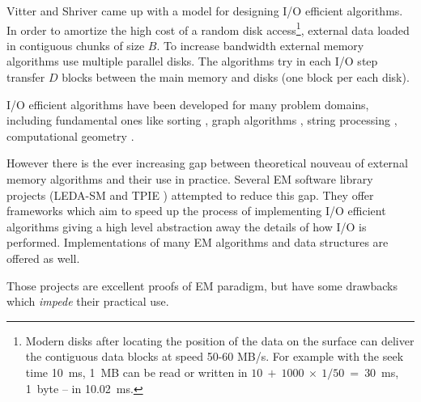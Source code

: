 \documentclass[twoside]{book}
\begin{document}
Vitter and Shriver \cite{VitShr94both} came up with a model for designing I/O
efficient algorithms. In order to amortize the high cost of a random
disk access\footnote{Modern disks after locating the position of the
data on the surface can deliver the contiguous data blocks at speed
50-60 MB/s. For example with the seek time 10~ms, 1~MB can be read or
written in $10~+~1000~\times~1/50~=~30$~ms, 1~byte -- in 10.02~ms.},
external data loaded in contiguous chunks of size $B$. To increase
bandwidth external memory algorithms use multiple parallel disks. The
algorithms try in each I/O step transfer $D$ blocks between the main
memory and disks (one block per each disk).


I/O efficient algorithms have been developed for many
problem domains, including fundamental ones like sorting \cite{},
graph algorithms \cite{}, string processing \cite{}, computational
geometry \cite{}. 

However there is the ever increasing gap between theoretical
nouveau of external memory algorithms and their use in practice.   
Several EM software library projects (LEDA-SM \cite{CraMeh99} and TPIE
\cite{APV02}) attempted to 
reduce this gap. They offer frameworks which aim to speed up the
process of implementing I/O efficient algorithms giving a high level
abstraction away the details of how I/O is performed. Implementations
of many EM algorithms and data structures are offered as well.

Those projects are excellent proofs of EM paradigm, but have
some drawbacks which \emph{impede} their practical use.
\end{document}
